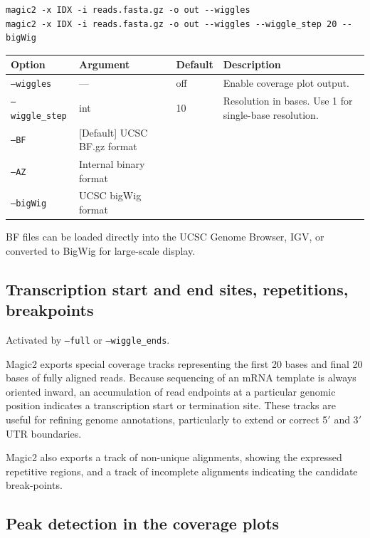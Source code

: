 \documentclass[11pt]{article}
\newcommand{\code}[1]{\texttt{#1}}
\begin{document}
\begin{lstlisting}
magic2 -x IDX -i reads.fasta.gz -o out --wiggles
magic2 -x IDX -i reads.fasta.gz -o out --wiggles --wiggle_step 20 --bigWig
\end{lstlisting}

\begin{center}
\begin{tabular}{lll p{5.5cm}}
\toprule
\textbf{Option} & \textbf{Argument} & \textbf{Default} & \textbf{Description} \\
\midrule
\code{--wiggles}      & ---  & off & Enable coverage plot output. \\
\code{--wiggle\_step} & int  & 10  & Resolution in bases.  Use 1 for
single-base resolution. \\
\code{--BF} &[Default] UCSC BF.gz format\\
\code{--AZ} &Internal binary format\\
\code{--bigWig} &UCSC bigWig format\\
\bottomrule
\end{tabular}
\end{center}

BF files can be loaded directly into the UCSC Genome Browser, IGV, or
converted to BigWig for large-scale display.

\subsection{Transcription start and end sites, repetitions, breakpoints}
\label{sec:tss}

Activated by \code{--full} or \code{--wiggle\_ends}.

Magic2 exports special coverage tracks representing the first 20 bases
and final 20 bases of fully aligned reads.  Because sequencing of an
mRNA template is always oriented inward, an accumulation of read
endpoints at a particular genomic position indicates a transcription
start or termination site.  These tracks are useful for refining genome
annotations, particularly to extend or correct 5$'$ and 3$'$ UTR
boundaries.

Magic2 also exports a track of non-unique alignments, showing the
expressed repetitive regions, and a track of incomplete alignments indicating
the candidate break-points.

\subsection{Peak detection in the coverage plots}
\label{sec:peaks}
\end{document}
